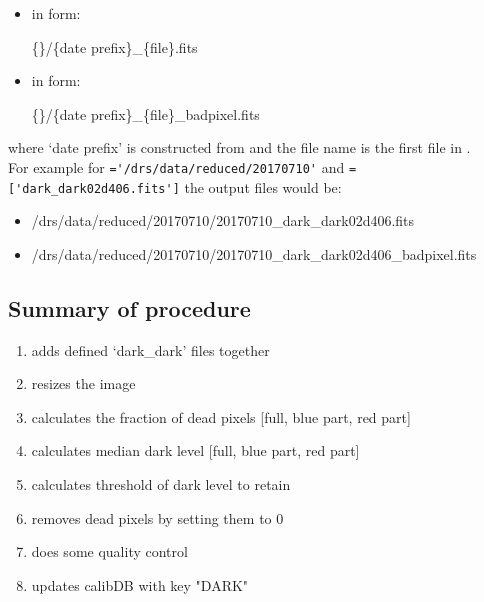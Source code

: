 \begin{itemize}
\item {} in form:
\begin{tcustomdir}
\{\reduceddir\}/\{date prefix\}\_\{file\}.fits
\end{tcustomdir}

\item {} in form:
\begin{tcustomdir}
\{\reduceddir\}/\{date prefix\}\_\{file\}\_badpixel.fits
\end{tcustomdir}
\end{itemize}

\noindent where `date prefix' is constructed from \argnightname and the file name is the first file in \argfilenames. \\

\noindent For example for \reduceddir\lstinline[style=pythoninline]|='/drs/data/reduced/20170710'| and \argfilenames\lstinline[style=pythoninline]|=['dark_dark02d406.fits']| the output files would be:
\begin{tcustomdir}
\begin{itemize}
\item /drs/data/reduced/20170710/20170710\_dark\_dark02d406.fits
\item /drs/data/reduced/20170710/20170710\_dark\_dark02d406\_badpixel.fits
\end{itemize}
\end{tcustomdir}

\subsection{Summary of procedure}
\begin{enumerate}
\item adds defined `dark\_dark' files together
\item resizes the image
\item calculates the fraction of dead pixels [full, blue part, red part]
\item calculates median dark level [full, blue part, red part]
\item calculates threshold of dark level to retain
\item removes dead pixels by setting them to 0
\item does some quality control
\item updates calibDB with key "DARK"
\end{enumerate}


